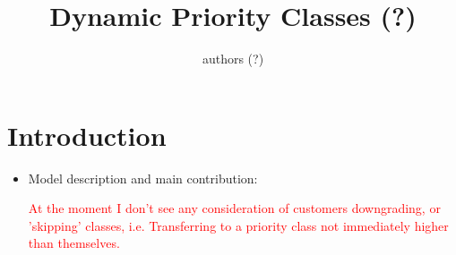 \documentclass{article}
\title{Dynamic Priority Classes (?)}
\author{authors (?)}
\date{}
\begin{document}
\maketitle

\section{Introduction}

\begin{itemize}
    \item Model description and main contribution:

        \textcolor{red}{At the moment I don't see any consideration of customers
        downgrading, or 'skipping' classes, i.e. Transferring to a priority
        class not immediately higher than themselves.}


\end{itemize}
\end{document}
